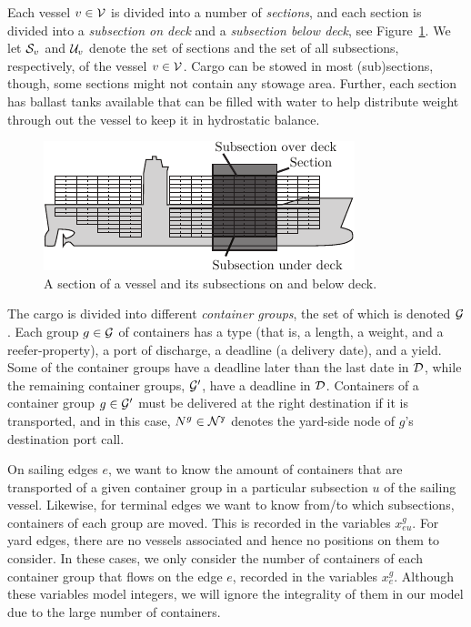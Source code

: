 Each vessel $v\in\mathcal{V}$ is divided into a number of \emph{sections}, and each section is divided into a \emph{subsection on deck} and a \emph{subsection below deck}, see Figure~\ref{fig:vessel}. We let $\mathcal{S}_v$ and $\mathcal{U}_v$ denote the set of sections and the set of all subsections, respectively, of the vessel $v\in \mathcal{V}$.
Cargo can be stowed in most (sub)sections, though, some sections might not contain any stowage area. Further, each section has ballast tanks available that can be filled with water to help distribute weight through out the vessel to keep it in hydrostatic balance.

\begin{figure}
	\centering
		\includegraphics[scale = 1.2]{figures/vessel2.pdf}
		\caption{A section of a vessel and its subsections on and below deck.}  \label{fig:vessel}
\end{figure}

The cargo is divided into different \emph{container groups}, the set of which is denoted $\mathcal{G}$. Each group $g\in \mathcal{G}$ of containers has a type (that is, a length, a weight, and a reefer-property), a port of discharge, a deadline (a delivery date), and a yield. Some of the container groups have a deadline later than the last date in $\mathcal{D}$, while the remaining container groups, $\mathcal{G}'$, have a deadline in $\mathcal{D}$. Containers of a container group $g\in\mathcal{G}'$ must be delivered at the right destination if it is transported, and in this case, $N^g \in \mathcal{N}^\texttt{y}$ denotes the yard-side node of $g$'s destination port call.  

On sailing edges $e$, we want to know the amount of containers that are transported of a given container group in a particular subsection $u$ of the sailing vessel. Likewise, for terminal edges we want to know from/to which subsections, containers of each group are moved. This is recorded in the variables $x^g_{eu}$. For yard edges, there are no vessels associated and hence no positions on them to consider. In these cases, we only consider the number of containers of each container group that flows on the edge $e$, recorded in the variables $x^g_e$. Although these variables model integers,  we will ignore the integrality of them in our model due to the large number of containers.

